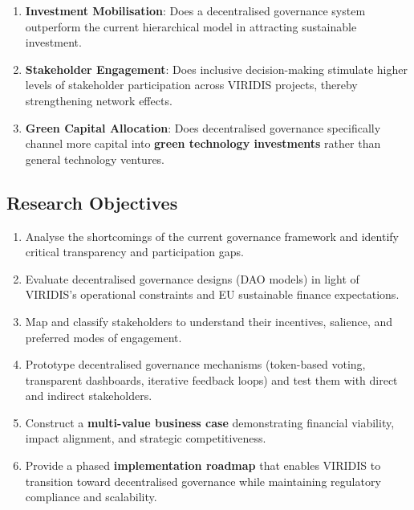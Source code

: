 \documentclass[
  english,
  12pt,
  oneside,
  open=any]{scrbook}
\providecommand{\tightlist}{%
  \setlength{\itemsep}{0pt}\setlength{\parskip}{0pt}}\usepackage{longtable,booktabs,array}
\begin{document}
\begin{enumerate}
\def\labelenumi{\arabic{enumi}.}
\tightlist
\item
  \textbf{Investment Mobilisation}: Does a decentralised governance
  system outperform the current hierarchical model in attracting
  sustainable investment.\\
\item
  \textbf{Stakeholder Engagement}: Does inclusive decision-making
  stimulate higher levels of stakeholder participation across VIRIDIS
  projects, thereby strengthening network effects.\\
\item
  \textbf{Green Capital Allocation}: Does decentralised governance
  specifically channel more capital into \textbf{green technology
  investments} rather than general technology ventures.
\end{enumerate}

\subsection{Research Objectives}\label{research-objectives}

\begin{enumerate}
\def\labelenumi{\arabic{enumi}.}
\tightlist
\item
  Analyse the shortcomings of the current governance framework and
  identify critical transparency and participation gaps.\\
\item
  Evaluate decentralised governance designs (DAO models) in light of
  VIRIDIS's operational constraints and EU sustainable finance
  expectations.\\
\item
  Map and classify stakeholders to understand their incentives,
  salience, and preferred modes of engagement.\\
\item
  Prototype decentralised governance mechanisms (token-based voting,
  transparent dashboards, iterative feedback loops) and test them with
  direct and indirect stakeholders.\\
\item
  Construct a \textbf{multi-value business case} demonstrating financial
  viability, impact alignment, and strategic competitiveness.\\
\item
  Provide a phased \textbf{implementation roadmap} that enables VIRIDIS
  to transition toward decentralised governance while maintaining
  regulatory compliance and scalability.
\end{enumerate}
\end{document}
